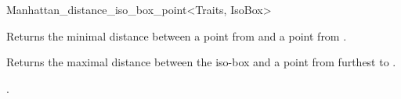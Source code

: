 \begin{ccRefClass}{Manhattan_distance_iso_box_point<Traits, IsoBox>}

{Returns the minimal distance between a point from  and a point from
.}

{Returns the maximal distance between the iso-box  and
a point from  furthest to .}


\ccSeeAlso

.




\end{ccRefClass}


